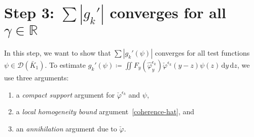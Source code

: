 \section{Step 3: \texorpdfstring{\(\sum |g_k'|\) converges for all \(\gamma \in \mathbb{R}\)}{Sum gk converges for all real gamma}}\label{chapter:step-3}

In this step, we want to show that \(\sum |g_k'(\psi)|\) converges for all test functions \(\psi \in \mathcal{D}(\bar K_1)\). To estimate \(g_k'(\psi) \coloneqq \iint F_y(\hat{\varphi}^{\epsilon_k}_{y}) \check \varphi^{\epsilon_k}(y-z) \psi(z) \, \mathrm{d}y \, \mathrm{d}z\), we use three arguments: 
\begin{enumerate}
    \item a \emph{compact support} argument for \(\check \varphi^{\epsilon_k}\) and \(\psi\), 
    \item a \emph{local homogeneity bound} argument~\eqref{coherence-hat}, and
    \item an \emph{annihilation} argument due to \(\check \varphi\).
\end{enumerate}

